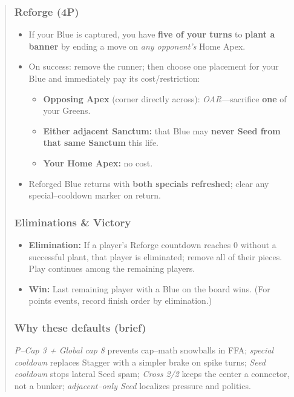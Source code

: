 \documentclass[11pt]{article}
\begin{document}
\begin{quote}
\subsubsection*{Reforge (4P)}
\begin{itemize}[leftmargin=1.3em,itemsep=0.25em]
  \item If your Blue is captured, you have \textbf{five of your turns} to \textbf{plant a banner} by ending a move on \emph{any opponent’s} Home Apex.
  \item On success: remove the runner; then choose one placement for your Blue and immediately pay its cost/restriction:
  \begin{itemize}[leftmargin=1.3em,itemsep=0.1em]
    \item \textbf{Opposing Apex} (corner directly across): \textit{OAR}—sacrifice \textbf{one} of your Greens.
    \item \textbf{Either adjacent Sanctum:} that Blue may \textbf{never Seed from that same Sanctum} this life.
    \item \textbf{Your Home Apex:} no cost.
  \end{itemize}
  \item Reforged Blue returns with \textbf{both specials refreshed}; clear any special–cooldown marker on return.
\end{itemize}

\subsubsection*{Eliminations \& Victory}
\begin{itemize}[leftmargin=1.3em,itemsep=0.25em]
  \item \textbf{Elimination:} If a player’s Reforge countdown reaches 0 without a successful plant, that player is eliminated; remove all of their pieces. Play continues among the remaining players.
  \item \textbf{Win:} Last remaining player with a Blue on the board wins. (For points events, record finish order by elimination.)
\end{itemize}

\subsubsection*{Why these defaults (brief)}
\noindent \emph{P–Cap 3 + Global cap 8} prevents cap–math snowballs in FFA; \emph{special cooldown} replaces Stagger with a simpler brake on spike turns; \emph{Seed cooldown} stops lateral Seed spam; \emph{Cross 2/2} keeps the center a connector, not a bunker; \emph{adjacent–only Seed} localizes pressure and politics.


\end{quote}
\end{document}
